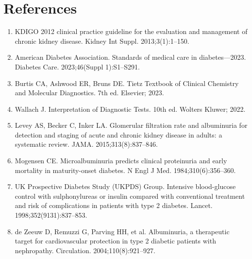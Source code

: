 \section*{References}
\begin{enumerate}
  \item KDIGO 2012 clinical practice guideline for the evaluation and management of chronic kidney disease. Kidney Int Suppl. 2013;3(1):1--150.
  \item American Diabetes Association. Standards of medical care in diabetes---2023. Diabetes Care. 2023;46(Suppl 1):S1--S291.
  \item Burtis CA, Ashwood ER, Bruns DE. Tietz Textbook of Clinical Chemistry and Molecular Diagnostics. 7th ed. Elsevier; 2023.
  \item Wallach J. Interpretation of Diagnostic Tests. 10th ed. Wolters Kluwer; 2022.
  \item Levey AS, Becker C, Inker LA. Glomerular filtration rate and albuminuria for detection and staging of acute and chronic kidney disease in adults: a systematic review. JAMA. 2015;313(8):837--846.
  \item Mogensen CE. Microalbuminuria predicts clinical proteinuria and early mortality in maturity-onset diabetes. N Engl J Med. 1984;310(6):356--360.
  \item UK Prospective Diabetes Study (UKPDS) Group. Intensive blood-glucose control with sulphonylureas or insulin compared with conventional treatment and risk of complications in patients with type 2 diabetes. Lancet. 1998;352(9131):837--853.
  \item de Zeeuw D, Remuzzi G, Parving HH, et al. Albuminuria, a therapeutic target for cardiovascular protection in type 2 diabetic patients with nephropathy. Circulation. 2004;110(8):921--927.
\end{enumerate}

\clearpage

